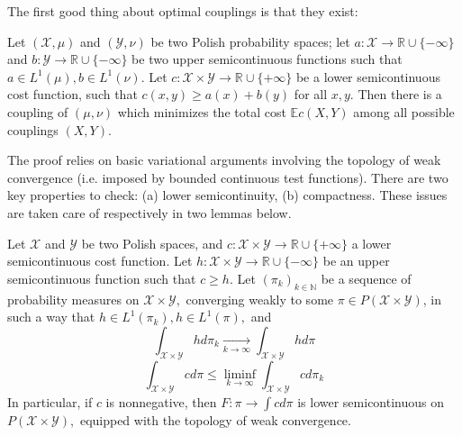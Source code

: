 The first good thing about optimal couplings is that they exist:
\begin{thm}
	Let \( ( \mathcal { X } , \mu ) \) and \( ( \mathcal { Y } , \nu ) \) be two Polish probability spaces; let \( a: \mathcal { X } \rightarrow \mathbb { R } \cup \{ - \infty \} \) and \( b: \mathcal { Y } \rightarrow \mathbb { R } \cup \{ - \infty \} \) be two upper semicontinuous functions such that \( a \in L ^ { 1 } ( \mu ) , b \in L ^ { 1 } ( \nu ) . \) Let \( c: \mathcal { X } \times \mathcal { Y } \rightarrow \mathbb { R } \cup \{ + \infty \} \) be a lower semicontinuous cost function, such that \( c ( x , y ) \geq a ( x ) + b ( y ) \) for all \( x , y . \) Then there is a coupling of \( ( \mu , \nu ) \) which minimizes the total cost \( \mathbb { E } c ( X , Y ) \) among all possible couplings \( ( X , Y ) \).
\end{thm}
The proof relies on basic variational arguments involving the topology of weak convergence (i.e. imposed by bounded continuous test functions). There are two key properties to check: (a) lower semicontinuity, (b) compactness. These issues are taken care of respectively in two lemmas below.

\begin{lem}
	\label{lower_semicontinuity_of_the_cost_functional}
	Let \( \mathcal { X } \) and \( \mathcal { Y } \) be two Polish spaces, and \( c: \mathcal { X } \times \mathcal { Y } \rightarrow \mathbb { R } \cup \{ + \infty \} \) a lower semicontinuous cost function. Let \( h: \mathcal { X } \times \mathcal { Y } \rightarrow \mathbb { R } \cup \{ - \infty \} \) be an upper semicontinuous function such that \( c \geq h . \) Let \( \left( \pi _ { k } \right) _ { k \in \mathbb { N } } \) be a sequence of
	probability measures on \( \mathcal { X } \times \mathcal { Y } , \) converging weakly to some \( \pi \in P ( \mathcal { X } \times \mathcal { Y } ) \), in such a way that \( h \in L ^ { 1 } \left( \pi _ { k } \right) , h \in L ^ { 1 } ( \pi ) , \) and
	\[ \int _ { \mathcal { X } \times \mathcal { Y } } h d \pi _ { k } \underset { k \rightarrow \infty } { \longrightarrow } \int _ { \mathcal { X } \times \mathcal { Y } } h d \pi \]
	\[ \int _ { \mathcal { X } \times \mathcal { Y } } c d \pi \leq \liminf _ { k \rightarrow \infty } \int _ { \mathcal { X } \times \mathcal { Y } } c d \pi _ { k } \]
	In particular, if \( c \) is nonnegative, then \( F: \pi \rightarrow \int c d \pi \) is lower semicontinuous on \( P ( \mathcal { X } \times \mathcal { Y } ) , \) equipped with the topology of weak convergence.
\end{lem}

